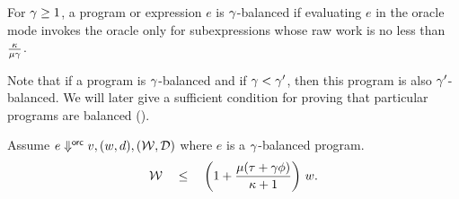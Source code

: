 \begin{definition}
For ${\gamma} \ge 1$, a program or expression $e$ is ${\gamma}$-balanced if
evaluating $e$ in the oracle mode invokes the oracle only for
subexpressions whose raw work is no less than
$\frac{{\kappa}}{{\mu}{\gamma}}$.
\end{definition}
%
Note that if a program is ${\gamma}$-balanced and 
if ${\gamma} < {\gamma}'$, then this program is also ${\gamma}'$-balanced.
We will later give a sufficient condition for
proving that particular programs are balanced ().


\begin{theorem}
\label{thm:orc-cost-work}
\label{thm:real-orc-work}
Assume ${ e } \Downarrow^{\textsf{orc}} {v}, ({w},{d}), ({{\mathcal{W}}},{{\mathcal{D}}})$ where $e$ is
a ${\gamma}$-balanced program.
\[
{\mathcal{W}} \quad \leq \quad \left(1+\frac{{\mu}({\tau}+{\gamma}{\phi})}{{\kappa}+1} \right)\,{w}.
\]

\end{theorem}
